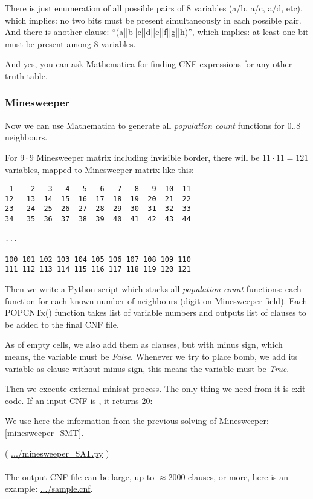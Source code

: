 There is just enumeration of all possible pairs of 8 variables (a/b, a/c, a/d, etc), which implies:
no two bits must be present simultaneously in each possible pair.
And there is another clause: ``(a||b||c||d||e||f||g||h)'', which implies:
at least one bit must be present among 8 variables.

And yes, you can ask Mathematica for finding \ac{CNF} expressions for any other truth table.

\subsubsection{Minesweeper}

Now we can use Mathematica to generate all \textit{population count} functions for 0..8 neighbours.

For $9 \cdot 9$ Minesweeper matrix including invisible border, there will be $11 \cdot 11=121$ variables,
mapped to Minesweeper matrix like this:

\begin{lstlisting}
 1    2   3   4   5   6   7   8   9  10  11
12   13  14  15  16  17  18  19  20  21  22
23   24  25  26  27  28  29  30  31  32  33
34   35  36  37  38  39  40  41  42  43  44

...

100 101 102 103 104 105 106 107 108 109 110
111 112 113 114 115 116 117 118 119 120 121
\end{lstlisting}

Then we write a Python script which stacks all \textit{population count} functions:
each function for each known number of neighbours (digit on Minesweeper field).
Each POPCNTx() function takes list of variable numbers and outputs list of clauses to be added to the final \ac{CNF} file.

As of empty cells, we also add them as clauses, but with minus sign, which means, the variable must be \textit{False}.
Whenever we try to place bomb, we add its variable as clause without minus sign, this means the variable must be \textit{True}.

Then we execute external minisat process.
The only thing we need from it is exit code.
If an input \ac{CNF} is , it returns 20:

We use here the information from the previous solving of Minesweeper: \ref{minesweeper_SMT}.



( \url{.../minesweeper_SAT.py} ) \\
\\
The output \ac{CNF} file can be large, up to $\approx 2000$ clauses, or more, here is an example:
\url{.../sample.cnf}.

